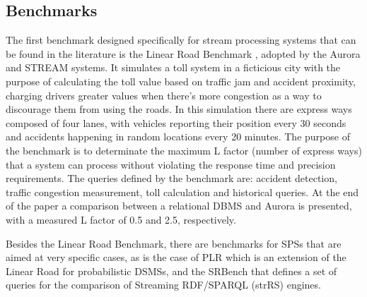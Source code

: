 \documentclass[ppgc,diss,english]{iiufrgs}
\begin{document}
\subsection{Benchmarks}

The first benchmark designed specifically for stream processing systems that can be found in the literature is the Linear Road Benchmark \cite{arasu2004linear}, adopted by the Aurora \cite{abadi2003aurora} and STREAM \cite{arasu2004stream} systems. It simulates a toll system in a ficticious city with the purpose of calculating the toll value based on traffic jam and accident proximity, charging drivers greater values when there's more congestion as a way to discourage them from using the roads. In this simulation there are express ways composed of four lanes, with vehicles reporting their position every 30 seconds and accidents happening in random locations every 20 minutes. The purpose of the benchmark is to determinate the maximum L factor (number of express ways) that a system can process without violating the response time and precision requirements. The queries defined by the benchmark are: accident detection, traffic congestion measurement, toll calculation and historical queries. At the end of the paper a comparison between a relational DBMS and Aurora is presented, with a measured L factor of 0.5 and 2.5, respectively.


Besides the Linear Road Benchmark, there are benchmarks for SPSs that are aimed at very specific cases, as is the case of PLR \cite{karachi2012plr} which is an extension of the Linear Road for probabilistic DSMSs, and the SRBench \cite{zhang2012srbench} that defines a set of queries for the comparison of Streaming RDF/SPARQL (strRS) engines.

\end{document}
